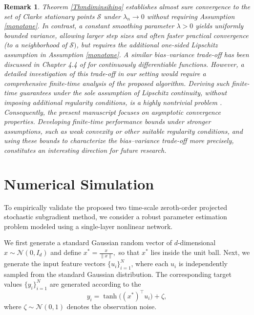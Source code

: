 \documentclass[9pt,journal,twoside,web]{ieeecolor}
\newtheorem{remark}{Remark}
\newcommand{\norm}[1]{\left\lVert #1 \right\rVert}
\begin{document}
\begin{remark}
Theorem \ref{Thmdiminsihing} establishes almost sure convergence to the set of Clarke stationary points $\mathcal{S}$ under $\lambda_n \to 0$ without requiring Assumption \ref{monotone}. In contrast, a constant smoothing parameter $\lambda>0$ yields uniformly bounded variance, allowing larger step sizes and often faster practical convergence (to a neighborhood of $\mathcal{S})$, but requires the additional one-sided Lipschitz assumption in Assumption \ref{monotone}. A similar bias--variance trade-off has been discussed in Chapter 4.4 of \cite{haykin2009neural} for continuously differentiable functions. However, a detailed investigation of this trade-off in our setting would require a comprehensive finite-time analysis of the proposed algorithm. Deriving such finite-time guarantees under the sole assumption of Lipschitz continuity, without imposing additional regularity conditions, is a highly nontrivial problem \cite{zhang2020complexity}. Consequently, the present manuscript focuses on asymptotic convergence properties. Developing finite-time performance bounds under stronger assumptions, such as weak convexity or other suitable regularity conditions, and using these bounds to characterize the bias--variance trade-off more precisely, constitutes an interesting direction for future research.
\end{remark}
\color{black}

\section{Numerical Simulation}

To empirically validate the proposed two time-scale zeroth-order projected stochastic subgradient method, we consider a robust parameter estimation problem modeled using a single-layer nonlinear network.

We first generate a standard Gaussian random vector of $d$-dimensional $x \sim \mathcal{N}(0,I_d)$ and define $x^\ast = \frac{x}{\norm{x}},$
so that $x^\ast$ lies inside the unit ball. Next, we generate the input feature vectors $\{u_i\}_{i=1}^N$, where each $u_i$ is independently sampled from the standard Gaussian distribution. The corresponding target values $\{y_i\}_{i=1}^N$ are generated according to the
\begin{equation*}
    y_i = \tanh\big((x^\ast)^\top u_i\big) + \zeta,
\end{equation*}
where $\zeta \sim \mathcal{N}(0,1)$ denotes the observation noise.
\end{document}
